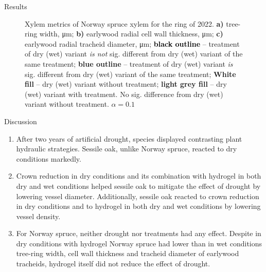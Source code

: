 \documentclass[final]{beamer}
\newlength{\colwidth}
\begin{document}
\begin{frame}[t]
\begin{columns}[t]
\begin{column}{\colwidth}
\begin{block}{Results}
\begin{figure}
    
    \caption{
        Xylem metrics of Norway spruce xylem for the ring of 2022.
        \textbf{a)} tree-ring width, \si{\micro\meter};
        \textbf{b)} earlywood radial cell wall thickness, \si{\micro\meter};
        \textbf{c)} earlywood radial tracheid diameter, \si{\micro\meter};
        \textbf{\textcolor{black}{black outline}} -- treatment of dry (wet) variant \emph{is not} sig. different from dry (wet) variant of the same treatment;
        \textbf{\textcolor[RGB]{31,120,180}{blue outline}} -- treatment of dry (wet) variant \emph{is} sig. different from dry (wet) variant of the same treatment;
        \textbf{\colorbox{white}{White fill}} -- dry (wet) variant without treatment;
        \textbf{\colorbox{gray!10}{light grey fill}} -- dry (wet) variant with treatment. No sig. difference from dry (wet) variant without treatment.
        $\alpha = 0.1$
    }
    \label{fig:spruce_box}
\end{figure}
\end{block}

\begin{block}{Discussion}
\setlength{\columnsep}{20pt}
\begin{multicols}{2}
    \begin{enumerate}
        \item After two years of artificial drought, species displayed contrasting plant hydraulic strategies. Sessile oak, unlike Norway spruce, reacted to dry conditions markedly.
        \item Crown reduction in dry conditions and its combination with hydrogel in both dry and wet conditions helped sessile oak to mitigate the effect of drought by lowering vessel diameter. Additionally, sessile oak reacted to crown reduction in dry conditions and to hydrogel in both dry and wet conditions by lowering vessel density.
        \item For Norway spruce, neither drought nor treatments had any effect. Despite in dry conditions with hydrogel Norway spruce had lower than in wet conditions tree-ring width, cell wall thickness and tracheid diameter of earlywood tracheids, hydrogel itself did not reduce the effect of drought.
    \end{enumerate}
\end{multicols}
\end{block}


\end{column}
\end{columns}
\end{frame}
\end{document}
